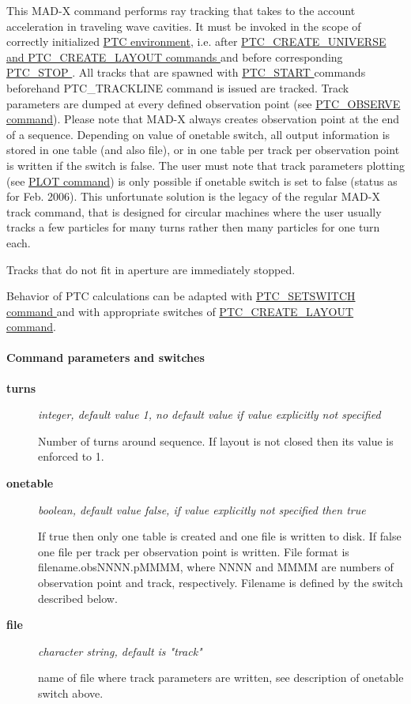 This MAD-X command performs ray tracking that takes to the account acceleration in traveling wave cavities. It must be invoked in the scope of correctly initialized \href{../ptc_general/ptc_general.html}{ PTC environment}, i.e. after \href{../ptc_general/ptc_general.html}{ PTC\_CREATE\_UNIVERSE and PTC\_CREATE\_LAYOUT commands } and before corresponding \href{../ptc_general/ptc_general.html}{ PTC\_STOP }. All tracks that are spawned with \href{../ptc_track/ptc_track.html}{ PTC\_START } commands beforehand PTC\_TRACKLINE command is issued are tracked. Track parameters are dumped at every defined observation point (see \href{../ptc_track/ptc_track.html}{ PTC\_OBSERVE command}). Please note that MAD-X always creates observation point at the end of a sequence. Depending on value of onetable switch, all output information is stored in one table (and also file), or in one table per track per observation point is written if the switch is false. The user must note that track parameters plotting (see \href{../plot/plot.html}{ PLOT command}) is only possible if onetable switch is set to false (status as for Feb. 2006). This unfortunate solution is the legacy of the regular MAD-X track command, that is designed for circular machines where the user usually tracks a few particles for many turns rather then many particles for one turn each. 

Tracks that do not fit in aperture are immediately stopped. 

Behavior of PTC calculations can be adapted with  \href{../ptc_auxiliaries/PTC_SetSwitch.html}{ PTC\_SETSWITCH command } and with appropriate switches of  \href{http://cern.ch/madx/ptc_general/ptc_general.html}{ PTC\_CREATE\_LAYOUT command}. 


\paragraph{ Command parameters and switches }
\begin{description}
	\item[\textbf{ turns }] \textit{ integer, default value 1, no default value if value explicitly not specified }

 Number of turns around sequence. If layout is not closed then its value is enforced to 1. 
	\item[\textbf{ onetable }] \textit{ boolean, default value false, if value explicitly not specified then true }

 If true then only one table is created and one file is written         to disk. If false one file per track per observation point is written.         File format is filename.obsNNNN.pMMMM, where NNNN and MMMM are numbers         of observation point and track, respectively. Filename is defined by         the switch described below.      
	\item[\textbf{ file }] \textit{ character string, default is "track" }

 name of file where track parameters are written, see description of onetable switch above. 
\end{description}


